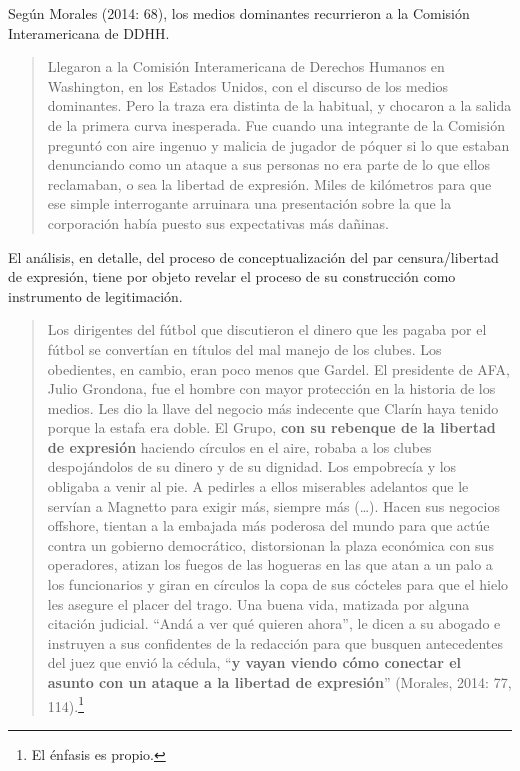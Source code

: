 Según Morales (2014: 68), los medios dominantes recurrieron a la Comisión Interamericana de DDHH.

\begin{quote}
Llegaron a la Comisión Interamericana de Derechos Humanos en Washington, en los Estados Unidos, con el discurso de los medios dominantes. Pero la traza era distinta de la habitual, y chocaron a la salida de la primera curva inesperada. Fue cuando una integrante de la Comisión preguntó con aire ingenuo y malicia de jugador de póquer si lo que estaban denunciando como un ataque a sus personas no era parte de lo que ellos reclamaban, o sea la libertad de expresión. Miles de kilómetros para que ese simple interrogante arruinara una presentación sobre la que la corporación había puesto sus expectativas más dañinas.
\end{quote}

El análisis, en detalle, del proceso de conceptualización del par censura/libertad de expresión, tiene por objeto revelar el proceso de su construcción como instrumento de legitimación.

\begin{quote}
Los dirigentes del fútbol que discutieron el dinero que les pagaba por el fútbol se convertían en títulos del mal manejo de los clubes. Los obedientes, en cambio, eran poco menos que Gardel. El presidente de AFA, Julio Grondona, fue el hombre con mayor protección en la historia de los medios. Les dio la llave del negocio más indecente que Clarín haya tenido porque la estafa era doble. El Grupo, \textbf{con su rebenque de la libertad de expresión} haciendo círculos en el aire, robaba a los clubes despojándolos de su dinero y de su dignidad. Los empobrecía y los obligaba a venir al pie. A pedirles a ellos miserables adelantos que le servían a Magnetto para exigir más, siempre más (\ldots). Hacen sus negocios offshore, tientan a la embajada más poderosa del mundo para que actúe contra un gobierno democrático, distorsionan la plaza económica con sus operadores, atizan los fuegos de las hogueras en las que atan a un palo a los funcionarios y giran en círculos la copa de sus cócteles para que el hielo les asegure el placer del trago. Una buena vida, matizada por alguna citación judicial. ``Andá a ver qué quieren ahora'', le dicen a su abogado e instruyen a sus confidentes de la redacción para que busquen antecedentes del juez que envió la cédula, ``\textbf{y vayan viendo cómo conectar el asunto con un ataque a la libertad de expresión}'' (Morales, 2014: 77, 114).\footnote{El énfasis es propio.}
\end{quote}

